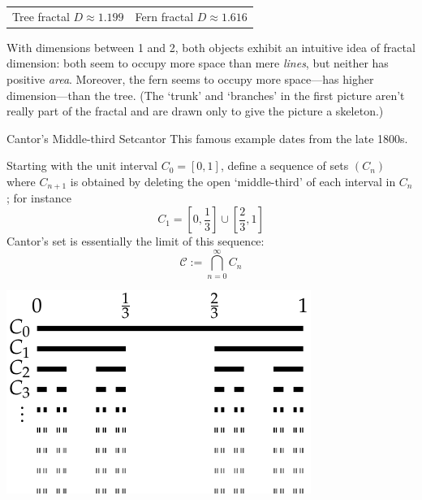 \begin{example}{}{}
\begin{center}
\begin{tabular}{c@{\qquad\qquad}c}
			\\
			Tree fractal $D\approx 1.199$
			&
			Fern fractal $D\approx 1.616$
		\end{tabular}
	\end{center}
	With dimensions between 1 and 2, both objects exhibit an intuitive idea of fractal dimension: both seem to occupy more space than mere \emph{lines}, but neither has positive \emph{area}. Moreover, the fern seems to occupy more space---has higher dimension---than the tree. (The `trunk' and `branches' in the first picture aren't really part of the fractal and are drawn only to give the picture a skeleton.)
\end{example}


\goodbreak


\begin{example}{Cantor's Middle-third Set}{cantor}
	This famous example dates from the late 1800s.\footnotemark{}\par
	\begin{minipage}[t]{0.58\linewidth}\vspace{-5pt}
		Starting with the unit interval $C_0=[0,1]$, define a sequence of sets $(C_n)$ where $C_{n+1}$ is obtained by deleting the open `middle-third' of each interval in $C_n$; for instance
		\[
			C_1=\left[0,\frac 13\right]\cup\left[\frac 23,1\right]
		\]
		Cantor's set is essentially the limit of this sequence:
		\[
			\mathcal C:=\bigcap_{n=0}^\infty C_n
		\]
	\end{minipage}
	\hfill
	\begin{minipage}[t]{0.4\linewidth}\vspace{-7pt}
		\flushright
	\href{http://www.math.uci.edu/~ndonalds/math161/cantor-similar.html}{\includegraphics{cantor-set}}
	\end{minipage}
	\medbreak


\end{example}
